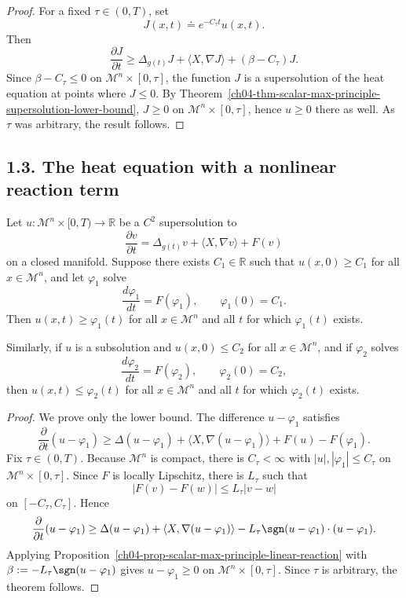 \begin{proof}
\sketch For a fixed \(\tau\in(0,T)\), set
\[
J(x,t)\doteq e^{-C_\tau t}u(x,t).
\]
Then
\[
\frac{\partial J}{\partial t}\ge \Delta_{g(t)}J+\langle X,\nabla J\rangle+(\beta-C_\tau)J.
\]
Since \(\beta-C_\tau\le 0\) on \(\mathcal M^n\times[0,\tau]\), the function \(J\) is a supersolution of the heat equation at points where \(J\le 0\). By Theorem~\ref{ch04-thm-scalar-max-principle-supersolution-lower-bound}, \(J\ge 0\) on \(\mathcal M^n\times[0,\tau]\), hence \(u\ge 0\) there as well. As \(\tau\) was arbitrary, the result follows.
\end{proof}

\subsection*{1.3. The heat equation with a nonlinear reaction term}

\begin{theorem}
\label{ch04-thm-scalar-max-principle-ode-bounds}

Let \(u : \mathcal M^n \times [0,T) \to \mathbb R\) be a \(C^2\) supersolution to
\[
\frac{\partial v}{\partial t} = \Delta_{g(t)} v + \langle X, \nabla v \rangle + F(v)
\]
on a closed manifold. Suppose there exists \(C_1 \in \mathbb R\) such that \(u(x,0)\ge C_1\) for all \(x \in \mathcal M^n\), and let \(\varphi_1\) solve
\[
\frac{d\varphi_1}{dt}=F(\varphi_1),\qquad \varphi_1(0)=C_1.
\]
Then \(u(x,t)\ge \varphi_1(t)\) for all \(x \in \mathcal M^n\) and all \(t\) for which \(\varphi_1(t)\) exists.

Similarly, if \(u\) is a subsolution and \(u(x,0)\le C_2\) for all \(x \in \mathcal M^n\), and if \(\varphi_2\) solves
\[
\frac{d\varphi_2}{dt}=F(\varphi_2),\qquad \varphi_2(0)=C_2,
\]
then \(u(x,t)\le \varphi_2(t)\) for all \(x \in \mathcal M^n\) and all \(t\) for which \(\varphi_2(t)\) exists.
\end{theorem}

\begin{proof}
\sketch {}
We prove only the lower bound. The difference \(u-\varphi_1\) satisfies
\[
\frac{\partial}{\partial t}(u-\varphi_1)\ge \Delta(u-\varphi_1)+\langle X,\nabla(u-\varphi_1)\rangle+F(u)-F(\varphi_1).
\]
Fix \(\tau\in(0,T)\). Because \(\mathcal M^n\) is compact, there is \(C_\tau<\infty\) with \(|u|,|\varphi_1|\le C_\tau\) on \(\mathcal M^n\times[0,\tau]\). Since \(F\) is locally Lipschitz, there is \(L_\tau\) such that
\[
|F(v)-F(w)|\le L_\tau |v-w|
\]
on \([-C_\tau,C_\tau]\). Hence
\[
\frac{\partial}{\partial t}(u-\varphi_1)\ge \Delta(u-\varphi_1)+\langle X,\nabla(u-\varphi_1)\rangle -L_\tau \sgn(u-\varphi_1)\cdot(u-\varphi_1).
\]
Applying Proposition~\ref{ch04-prop-scalar-max-principle-linear-reaction} with \(\beta:=-L_\tau\sgn(u-\varphi_1)\) gives \(u-\varphi_1\ge 0\) on \(\mathcal M^n\times[0,\tau]\). Since \(\tau\) is arbitrary, the theorem follows.
\end{proof}

